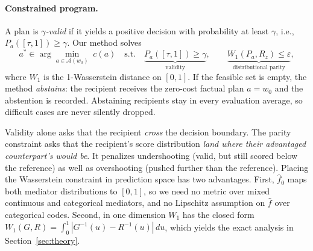 \paragraph{Constrained program.}
A plan is \emph{$\gamma$-valid} if it yields a positive decision with
probability at least $\gamma$, i.e., $P_a([\tau,1])\ge\gamma$. Our method
solves
\begin{equation}
  a^*\in\arg\min_{a\in\mathcal A(w_0)}\;c(a)
  \quad\text{s.t.}\quad
  \underbrace{P_a([\tau,1])\ge\gamma}_{\text{validity}},
  \qquad
  \underbrace{W_1(P_a,R_z)\le\varepsilon}_{\text{distributional parity}},
  \label{eq:program}
\end{equation}
where $W_1$ is the 1-Wasserstein distance on $[0,1]$. If the feasible set is
empty, the method \emph{abstains}: the recipient receives the zero-cost
factual plan $a=w_0$ and the abstention is recorded. Abstaining recipients
stay in every evaluation average, so difficult cases are never silently
dropped.

Validity alone asks that the recipient \emph{cross} the decision boundary. The
parity constraint asks that the recipient's score distribution \emph{land
where their advantaged counterpart's would be}. It penalizes undershooting
(valid, but still scored below the reference) as well as overshooting (pushed
further than the reference). Placing the Wasserstein constraint in prediction
space has two advantages. First, $\hat f_0$ maps both mediator distributions to
$[0,1]$, so we need no metric over mixed continuous and categorical
mediators, and no Lipschitz assumption on $\hat f$ over categorical codes.
Second, in one dimension $W_1$ has the closed form
$W_1(G,R)=\int_0^1|G^{-1}(u)-R^{-1}(u)|\,du$, which yields the exact analysis
in Section~\ref{sec:theory}.

